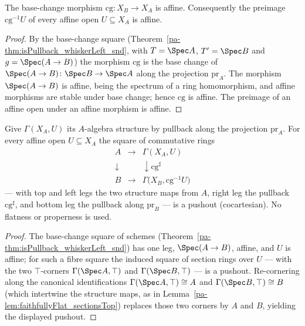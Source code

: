 \begin{theorem}
  \label{pa-thm:isAffineHom_cg}
  \leanok

  The base-change morphism \(\mathrm{cg} \colon X_B \to X_A\) is affine. Consequently the
  preimage \(\mathrm{cg}^{-1}U\) of every affine open \(U \subseteq X_A\) is affine.
\end{theorem}
\begin{proof}
  \leanok
  By the base-change square (Theorem~\ref{pa-thm:isPullback_whiskerLeft_snd}, with \(T = \Spec A\),
  \(T' = \Spec B\) and \(g = \Spec(A \to B)\)) the morphism \(\mathrm{cg}\) is the base change of
  \(\Spec(A \to B) \colon \Spec B \to \Spec A\) along the projection \(\mathrm{pr}_A\). The
  morphism \(\Spec(A \to B)\) is affine, being the spectrum of a ring homomorphism, and affine
  morphisms are stable under base change; hence \(\mathrm{cg}\) is affine. The preimage of an
  affine open under an affine morphism is affine.
\end{proof}

\begin{theorem}
  \label{pa-thm:isPushout_cgSectionRing}
  \leanok

  Give \(\Gamma(X_A, U)\) its \(A\)-algebra structure by pullback along the projection
  \(\mathrm{pr}_A\). For every affine open \(U \subseteq X_A\) the square of commutative rings
  \[
    \begin{array}{ccc}
      A & \longrightarrow & \Gamma(X_A, U) \\
      \downarrow & & \downarrow \mathrm{cg}^{\sharp} \\
      B & \longrightarrow & \Gamma\bigl(X_B, \mathrm{cg}^{-1}U\bigr)
    \end{array}
  \]
  --- with top and left legs the two structure maps from \(A\), right leg the pullback
  \(\mathrm{cg}^{\sharp}\), and bottom leg the pullback along \(\mathrm{pr}_B\) --- is a pushout
  (cocartesian). No flatness or properness is used.
\end{theorem}
\begin{proof}
  \leanok
  The base-change square of schemes (Theorem~\ref{pa-thm:isPullback_whiskerLeft_snd}) has one leg,
  \(\Spec(A \to B)\), affine, and \(U\) is affine; for such a fibre square the induced square of
  section rings over \(U\) --- with the two \(\top\)-corners \(\Gamma(\Spec A, \top)\) and
  \(\Gamma(\Spec B, \top)\) --- is a pushout. Re-cornering along the canonical identifications
  \(\Gamma(\Spec A, \top) \cong A\) and \(\Gamma(\Spec B, \top) \cong B\) (which intertwine the
  structure maps, as in Lemma~\ref{pa-lem:faithfullyFlat_sectionsTop}) replaces those two corners by
  \(A\) and \(B\), yielding the displayed pushout.
\end{proof}

